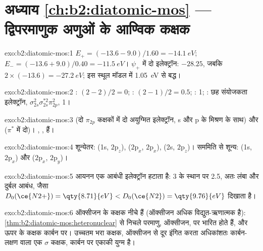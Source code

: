 \section*{अध्याय \ref{ch:b2:diatomic-mos} --- द्विपरमाणुक अणुओं के आण्विक कक्षक}

\begin{solution}{exo:b2:diatomic-mos:1}
$E_+ = (-13.6 - 9.0)/1.60 = \qty{-14.1}{eV}$; $E_- = (-13.6 + 9.0)/0.40 = \qty{-11.5}{eV}$।
$\psi_+$ में दो इलेक्ट्रॉन: $-28.25$, जबकि $2 \times (-13.6) = \qty{-27.2}{eV}$; इस स्थूल मॉडल में
\qty{1.05}{eV} से बद्ध।
\end{solution}

\begin{solution}{exo:b2:diatomic-mos:2}
: $(2 - 2)/2 = 0$; : $(2 - 1)/2 = 0.5$; : 1; : छह संयोजकता
इलेक्ट्रॉन, $\sigma_{2s}^2\sigma_{2s}^{*2}\pi_{2p}^2$,  1।
\end{solution}

\begin{solution}{exo:b2:diatomic-mos:3}
 (दो $\pi_{2p}$ कक्षकों में दो अयुग्मित इलेक्ट्रॉन, s और p के मिश्रण के साथ) और
 ($\pi^*$ में दो)। , ,   हैं।
\end{solution}

\begin{solution}{exo:b2:diatomic-mos:4}
शून्येतर: (1s, $2\mathrm p_z$), ($2\mathrm p_x$, $2\mathrm p_x$), (2s, $2\mathrm p_z$)।
सममिति से शून्य: (1s, $2\mathrm p_x$) और ($2\mathrm p_x$, $2\mathrm p_y$)।
\end{solution}

\begin{solution}{exo:b2:diatomic-mos:5}
आयनन एक आबंधी इलेक्ट्रॉन हटाता है:  3 के स्थान पर 2.5, अतः लंबा और
दुर्बल आबंध, जैसा $D_0(\ce{N2+}) = \qty{8.71}{eV} < D_0(\ce{N2}) = \qty{9.76}{eV}$ दिखाता है।
\end{solution}

\begin{solution}{exo:b2:diatomic-mos:6}
ऑक्सीजन के कक्षक नीचे हैं (ऑक्सीजन अधिक विद्युत-ऋणात्मक है):
\cref{thm:b2:diatomic-mos:heteronuclear} से 
निचले परमाणु, ऑक्सीजन, पर भारित होते हैं, और ऊपर के कक्षक कार्बन पर। उच्चतम भरा
कक्षक, ऑक्सीजन से दूर इंगित करता अधिकांशतः कार्बन-लक्षण वाला एक $\sigma$ कक्षक,
कार्बन पर एकाकी युग्म है।
\end{solution}

